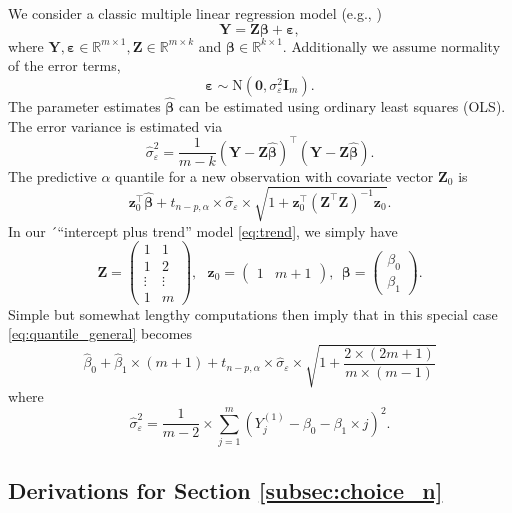 \documentclass[12pt]{article}
\begin{document}
We consider a classic multiple linear regression model (e.g., \citealt{Fahrmeir2013})
$$
\mathbf{Y} = \mathbf{Z}\boldsymbol{\beta} + \boldsymbol{\varepsilon},
$$
where $\mathbf{Y}, \boldsymbol{\varepsilon} \in \mathbb{R}^{m\times 1}, \mathbf{Z}\in \mathbb{R}^{m \times k}$ and $\boldsymbol{\beta} \in \mathbb{R}^{k \times 1}$. Additionally we assume normality of the error terms,
$$
\boldsymbol{\varepsilon} \sim \text{N}(\boldsymbol{0}, \sigma^2_\varepsilon \mathbf{I}_m).
$$
The parameter estimates $\hat{\boldsymbol{\beta}}$ can be estimated using ordinary least squares (OLS). The error variance is estimated via
$$
\hat{\sigma}^2_\varepsilon = \frac{1}{m - k} (\mathbf{Y} - \mathbf{Z}\hat{\boldsymbol{\beta}})^\top (\mathbf{Y} - \mathbf{Z}\hat{\boldsymbol{\beta}}).
$$
The predictive $\alpha$ quantile for a new observation with covariate vector $\mathbf{Z}_0$ is
\begin{equation}
\mathbf{z}_0^\top\hat{\boldsymbol{\beta}} + t_{n - p, \alpha} \times \hat{\sigma}_\varepsilon\times \sqrt{1 + \mathbf{z}_0^\top (\mathbf{Z}^\top\mathbf{Z})^{-1} \mathbf{z}_0}.\label{eq:quantile_general}
\end{equation}
In our ´``intercept plus trend'' model \eqref{eq:trend}, we simply have
$$
\mathbf{Z} = \left( \begin{array}{cc}
1 & 1\\
1 & 2\\
\vdots & \vdots\\
1 & m
\end{array}\right),\ \ \ \mathbf{z}_0 = \left( \begin{array}{cc}
1 & m + 1
\end{array}\right), \ \ 
\boldsymbol{\beta} = \left( \begin{array}{c}
\beta_0 \\ \beta_1
\end{array}\right).
$$
Simple but somewhat lengthy computations then imply that in this special case \eqref{eq:quantile_general} becomes
\begin{equation}
\hat{\beta}_0 + \hat{\beta}_1 \times (m + 1) + t_{n - p, \alpha} \times \hat{\sigma}_\varepsilon\times \sqrt{1 + \frac{2\times(2m + 1)}{m\times (m - 1)}}
\end{equation}
where
$$
\hat{\sigma}^2_\varepsilon = \frac{1}{m - 2} \times \sum_{j = 1}^m \left(Y^{(1)}_j - \beta_0 - \beta_1 \times j\right)^2.
$$

\subsection{Derivations for Section \ref{subsec:choice_n}}
\label{appendix:derivation_n}
\end{document}
